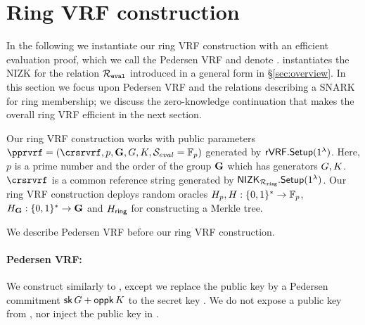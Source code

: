 
\def\tmpaux{\aux \doubleplus \piring \doubleplus \comring}
\def\tmpeprintaux{\eprint{\aux'}{\tmpaux}}
\def\tmpindent{\hspace*{5pt}}
\section{Ring VRF construction}%
\label{sec:pederson_vrf}

In the following we instantiate our ring VRF construction with an efficient evaluation proof, which
we call the Pedersen VRF and denote \PedVRF.
\PedVRF instantiates the NIZK for the relation $\mathcal{R}_{\mathtt{eval}}$ introduced in a general form 
in \S\ref{sec:overview}. In this section we focus upon Pedersen VRF and the relations 
describing a SNARK for ring membership; we discuss the zero-knowledge continuation
that makes the overall ring VRF efficient in the next section.

Our ring VRF construction works with public parameters $ \pprvrf = (\crsrvrf, p,\grE, \genG,\genB, \setsym{S}_{eval}  = \F_p)$ generated by $ {\mathsf{rVRF}}.{\mathsf{Setup}}(1^\lambda) $. Here, $ p $ is a prime number and the order of the group $ {\mathbf{G}} $ which has generators $ G,K $.  $ \crsrvrf $ is a common reference string generated by $ {\mathsf{NIZK}}_{\mathcal{R}_{\mathtt{ring}}}.{\mathsf{Setup}}(1^\lambda) $. Our ring VRF construction deploys random oracles $H_p,H: \{0,1\}^* \to \mathbb{F}_p$, $H_{{\mathbf{G}}}: \{0,1\}^* \to {\mathbf{G}}$ and $ H_{\mathsf{ring}} $ for constructing a Merkle tree.

We  describe Pedersen VRF before  our ring VRF construction.
\paragraph{Pedersen VRF:} 
We construct \PedVRF similarly to 
\cite{nsec5,VXEd25519,draft-irtf-cfrg-vrf-10},
except we replace the public key by a Pedersen commitment
$\mathsf{sk} \, G + \mathsf{oppk} \, K$ to the secret key \sk.
We do not expose a public key from \KeyGen, nor inject the public key in \Eval.

